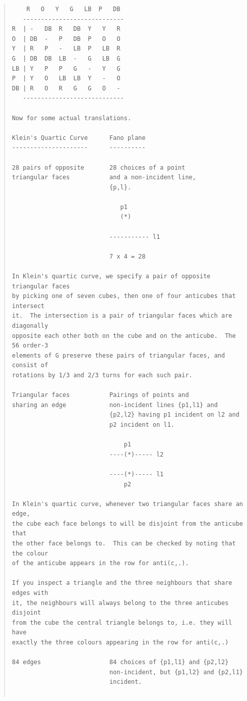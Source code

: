 \documentclass{article}
\begin{document}
\begin{quote}
\begin{verbatim}
    R   O   Y   G   LB  P   DB
   ----------------------------
R  | -   DB  R   DB  Y   Y   R
O  | DB  -   P   DB  P   O   O
Y  | R   P   -   LB  P   LB  R
G  | DB  DB  LB  -   G   LB  G
LB | Y   P   P   G   -   Y   G
P  | Y   O   LB  LB  Y   -   O
DB | R   O   R   G   G   O   -
   ----------------------------

Now for some actual translations.

Klein's Quartic Curve      Fano plane
---------------------      ----------

28 pairs of opposite       28 choices of a point
triangular faces           and a non-incident line,
                           {p,l}.

                              p1
                              (*)

                           ----------- l1

                           7 x 4 = 28

In Klein's quartic curve, we specify a pair of opposite triangular faces 
by picking one of seven cubes, then one of four anticubes that intersect 
it.  The intersection is a pair of triangular faces which are diagonally 
opposite each other both on the cube and on the anticube.  The 56 order-3 
elements of G preserve these pairs of triangular faces, and consist of 
rotations by 1/3 and 2/3 turns for each such pair.

Triangular faces           Pairings of points and
sharing an edge            non-incident lines {p1,l1} and
                           {p2,l2} having p1 incident on l2 and
                           p2 incident on l1.

                               p1
                           ----(*)----- l2

                           ----(*)----- l1
                               p2

In Klein's quartic curve, whenever two triangular faces share an edge, 
the cube each face belongs to will be disjoint from the anticube that 
the other face belongs to.  This can be checked by noting that the colour 
of the anticube appears in the row for anti(c,.).

If you inspect a triangle and the three neighbours that share edges with 
it, the neighbours will always belong to the three anticubes disjoint 
from the cube the central triangle belongs to, i.e. they will have 
exactly the three colours appearing in the row for anti(c,.)

84 edges                   84 choices of {p1,l1} and {p2,l2}
                           non-incident, but {p1,l2} and {p2,l1}
                           incident.


\end{verbatim}
\end{quote}
\end{document}
